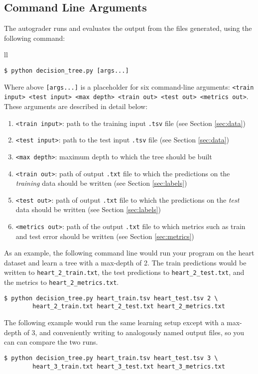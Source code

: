 \documentclass[11pt,addpoints,answers]{exam}
\begin{document}
\subsection{Command Line Arguments}

The autograder runs and evaluates the output from the files  generated, using the following command:

\begin{tabular}{ll}
\begin{lstlisting}[language=Shell]
$ python decision_tree.py [args...]
\end{lstlisting}
\end{tabular}

Where above \lstinline{[args...]} is a placeholder for six command-line arguments: 
\texttt{<train input> <test input> <max depth> <train out> <test out> <metrics out>}. These arguments are described in detail below:
\begin{enumerate}
\item \lstinline{<train input>}: path to the training input \lstinline{.tsv} file (see Section \ref{sec:data})
\item \lstinline{<test input>}: path to the test input \lstinline{.tsv} file (see Section \ref{sec:data})
\item \lstinline{<max depth>}: maximum depth to which the tree should be built
\item \lstinline{<train out>}: path of output \lstinline{.txt} file to which the predictions on the \textit{training} data should be written (see Section \ref{sec:labels})
\item \lstinline{<test out>}: path of output \lstinline{.txt} file to which the predictions on the \emph{test} data should be written (see Section \ref{sec:labels})
\item \lstinline{<metrics out>}: path of the output \lstinline{.txt} file to which metrics such as train and test error should be written (see Section \ref{sec:metrics})
\end{enumerate}

As an example, the following command line would run your program on the heart dataset and learn a tree with a max-depth of 2. The train predictions would be written to \lstinline{heart_2_train.txt}, the test predictions to \lstinline{heart_2_test.txt}, and the metrics to \lstinline{heart_2_metrics.txt}.
%
\begin{lstlisting}[language=Shell]
$ python decision_tree.py heart_train.tsv heart_test.tsv 2 \ 
        heart_2_train.txt heart_2_test.txt heart_2_metrics.txt
\end{lstlisting}
%
The following example would run the same learning setup except with a max-depth of 3, and conveniently writing to analogously named output files, so you can can compare the two runs.
%
\begin{lstlisting}[language=Shell]
$ python decision_tree.py heart_train.tsv heart_test.tsv 3 \ 
        heart_3_train.txt heart_3_test.txt heart_3_metrics.txt
\end{lstlisting}
\end{document}

